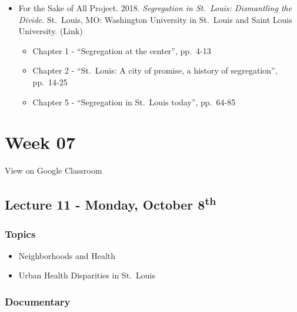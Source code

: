 \documentclass[]{book}
\providecommand{\tightlist}{%
  \setlength{\itemsep}{0pt}\setlength{\parskip}{0pt}}
\theoremstyle{definition}
\theoremstyle{definition}
\theoremstyle{definition}
\theoremstyle{remark}
\begin{document}
\begin{itemize}
\tightlist
\item
  For the Sake of All Project. 2018. \emph{Segregation in St.~Louis:
  Dismantling the Divide.} St.~Louis, MO: Washington University in
  St.~Louis and Saint Louis University. (Link)

  \begin{itemize}
  \tightlist
  \item
    Chapter 1 - ``Segregation at the center'', pp.~4-13
  \item
    Chapter 2 - ``St.~Louis: A city of promise, a history of
    segregation'', pp.~14-25
  \item
    Chapter 5 - ``Segregation in St.~Louis today'', pp.~64-85
  \end{itemize}
\end{itemize}

\hypertarget{week-07}{%
\section*{Week 07}\label{week-07}}

View on Google Classroom

\hypertarget{lecture-11---monday-october-8th}{%
\subsection*{\texorpdfstring{Lecture 11 - Monday, October
8\textsuperscript{th}}{Lecture 11 - Monday, October 8th}}\label{lecture-11---monday-october-8th}}

\hypertarget{topics-12}{%
\subsubsection*{Topics}\label{topics-12}}

\begin{itemize}
\tightlist
\item
  Neighborhoods and Health
\item
  Urban Health Disparities in St.~Louis
\end{itemize}

\hypertarget{documentary-2}{%
\subsubsection*{Documentary}\label{documentary-2}}
\end{document}
